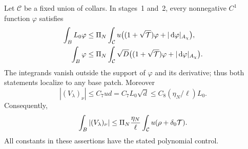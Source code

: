 \begin{lemma}\label{four:maximal:lem:weighted-trace}
Let $\mathcal C$ be a fixed union of collars. In stages~1 and~2, every
nonnegative $C^1$ function $\varphi$ satisfies
\begin{align}
 \int_B L_0\varphi
 &\le\Pi_N\int_{\mathcal C}
  u\bigl((1+\sqrt{\mathcal T})\varphi+|\,\mathrm d\varphi|_{A_\chi}\bigr),
       \label{four:maximal:bounds:trace-weighted}\\
 \int_B\varphi
 &\le\Pi_N\int_{\mathcal C}
  \sqrt D\bigl((1+\sqrt{\mathcal T})\varphi+|\,\mathrm d\varphi|_{A_\chi}\bigr).
       \label{four:maximal:bounds:trace-unweighted}
\end{align}
The integrands vanish outside the support of $\varphi$ and its
derivative; thus both statements localize to any base patch.
Moreover
\begin{equation}\label{four:maximal:bounds:boundary-flux}
 |(V_\lambda)_\nu|\le C_7ud=C_7L_0\sqrt d
                     \le C_8(\eta_N/\ell)L_0.
\end{equation}
Consequently,
\begin{equation}\label{four:maximal:bounds:boundary-absorption}
 \int_B|(V_\lambda)_\nu|
 \le \Pi_N\frac{\eta_N}{\ell}
             \int_{\mathcal C}u(\rho+\delta_0\mathcal T).
\end{equation}
All constants in these assertions have the stated polynomial control.
\end{lemma}

